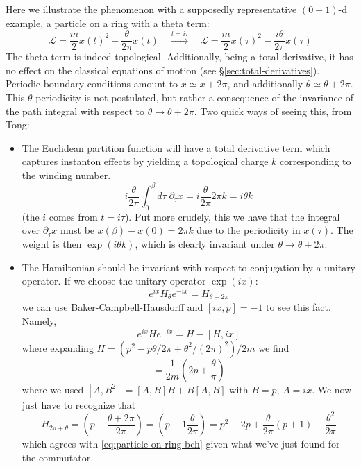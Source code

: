 \documentclass{report}
\begin{document}
 Here we illustrate the phenomenon with a supposedly
representative $ (0+1) $-d example, a particle on a ring with a theta term:
\begin{equation*}
	\mathcal{L} = \frac{m}{2}\dot{x}(t)^2 + \frac{\theta}{2\pi}\dot{x}(t)
	\quad \xrightarrow{t = i\tau}\quad 
	\mathcal{L} = \frac{m}{2}\dot{x}(\tau)^2 - \frac{i\theta}{2\pi}\dot{x}(\tau)
\end{equation*}
The theta term is indeed topological. Additionally, being a total derivative, 
it has no effect on the classical equations of motion (see \S\ref{sec:total-derivatives}).
Periodic boundary conditions amount to $ x \simeq x+ 2\pi$, and additionally $
\theta \simeq \theta + 2\pi $. This $ \theta $-periodicity is not postulated, 
but rather a consequence of the invariance of the path integral with respect to 
$ \theta \rightarrow \theta + 2\pi $. Two quick ways of seeing this, from Tong: 
\begin{itemize}[itemsep=0.2em]
\item The Euclidean partition function will have a total derivative term 
	which captures instanton effects by yielding a topological charge $ k $
	corresponding to the winding number.
	\begin{equation*}
			i\frac{\theta}{2\pi}
		\int_0^\beta d\tau\;	\partial_\tau x = i\frac{\theta}{2\pi} 2\pi k
		= i\theta k
	\end{equation*}
	(the $ i $ comes from $ t = i\tau $). Put more crudely, this we have 
	that the integral over $ \partial_\tau x $ must be $ x(\beta) - x(0) = 2\pi k$ 
	due to the periodicity in $ x(\tau) $. The weight is then $ \exp(i\theta k) $,
	which is clearly invariant under $ \theta \rightarrow \theta + 2\pi $.
\item The Hamiltonian should be invariant with respect to conjugation by 
	a unitary operator. If we choose the unitary operator $ \exp(ix) $: 
	\begin{equation*}
		e^{ix}H_\theta e^{-ix} = H_{\theta + 2\pi}
	\end{equation*}
	we can use Baker-Campbell-Hausdorff and $ [ix,p] = -1 $ to see this fact.
	Namely, 
	\begin{equation}\label{eq:particle-on-ring-bch}
		e^{ix} H e^{-ix} = H - [H, ix]
	\end{equation}
	where expanding $ H = (p^2 - p\theta/2\pi +\theta^2/(2\pi)^2)/2m $ we find 
	\begin{equation*}
		[H, ix] = \frac{1}{2m}\left(2p + \frac{\theta}{\pi}\right)
	\end{equation*}
	where we used $ [A,B^2] = [A,B]B + B[A,B] $ with $ B= p $, $ A=ix $. 
	We now just have to recognize that 
	\begin{equation*}
		H_{2\pi+\theta} = \left(p- \frac{\theta + 2\pi}{2\pi}\right)
			= \left(p - 1 \frac{\theta}{2\pi}\right)
			= p^2 - 2p + \frac{\theta}{2\pi}(p+1) - \frac{\theta^2}{2\pi}
	\end{equation*}
	which agrees with \cref{eq:particle-on-ring-bch} given what we've just 
	found for the commutator.
\end{itemize}
\end{document}
